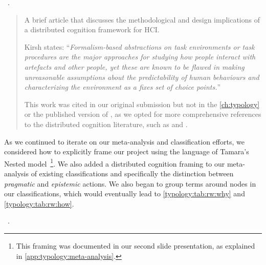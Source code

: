 \begin{sloppypar}
~\cite{Kirsh2006}. \end{sloppypar}

\begin{quotation}
    A brief article that discusses the methodological and design implications of a distributed cognition framework for \ac{HCI}.
    
    Kirsh states: ``{\it Formalism-based abstractions on task environments or task procedures are the major approaches for studying how people interact with artefacts and other people, yet these are known to be flawed in making unreasonable assumptions about the predictability of human behaviours and characterizing the environment as a fixes set of choice points.}''

    This work was cited in our original submission but not in the  \autoref{ch:typology} or the published version of \citet{Brehmer2013}, as we opted for more comprehensive references to the distributed cognition literature, such as \citet{Hollan2000} and \citet{Kirsh1994}.
\end{quotation}

As we continued to iterate on our meta-analysis and classification efforts, we considered how to explicitly frame our project using the language of Tamara's Nested model~\cite{Munzner2009}\footnote{This framing was documented in our second slide presentation, as explained in \autoref{app:typology:meta-analysis}.}.
We also added a distributed cognition framing to our meta-analysis of existing classifications and specifically the distinction between {\it pragmatic} and {\it epistemic} actions.
We also began to group terms around nodes in our classifications, which would eventually lead to \autoref{typology:tab:rw:why} and \autoref{typology:tab:rw:how}.

\begin{sloppypar}
~\cite{Kuhn1962}. \end{sloppypar}

